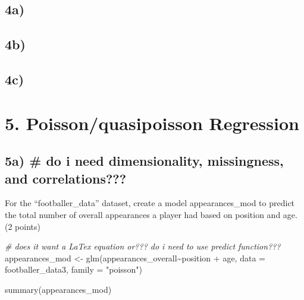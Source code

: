 \documentclass[
]{article}
\newenvironment{Shaded}{\begin{snugshade}}{\end{snugshade}}
\newcommand{\AttributeTok}[1]{\textcolor[rgb]{0.77,0.63,0.00}{#1}}
\newcommand{\CommentTok}[1]{\textcolor[rgb]{0.56,0.35,0.01}{\textit{#1}}}
\newcommand{\FunctionTok}[1]{\textcolor[rgb]{0.00,0.00,0.00}{#1}}
\newcommand{\NormalTok}[1]{#1}
\newcommand{\OtherTok}[1]{\textcolor[rgb]{0.56,0.35,0.01}{#1}}
\newcommand{\SpecialCharTok}[1]{\textcolor[rgb]{0.00,0.00,0.00}{#1}}
\newcommand{\StringTok}[1]{\textcolor[rgb]{0.31,0.60,0.02}{#1}}
\begin{document}
\hypertarget{a-2}{%
\subsection{4a)}\label{a-2}}

\hypertarget{b-2}{%
\subsection{4b)}\label{b-2}}

\hypertarget{c-3}{%
\subsection{4c)}\label{c-3}}

\hypertarget{poissonquasipoisson-regression}{%
\section{5. Poisson/quasipoisson
Regression}\label{poissonquasipoisson-regression}}

\hypertarget{a-do-i-need-dimensionality-missingness-and-correlations}{%
\subsection{5a) \# do i need dimensionality, missingness, and
correlations???}\label{a-do-i-need-dimensionality-missingness-and-correlations}}

For the ``footballer\_data'' dataset, create a model appearances\_mod to
predict the total number of overall appearances a player had based on
position and age. (2 points)

\begin{Shaded}
\begin{Highlighting}[]
\CommentTok{\# does it want a LaTex equation or??? do i need to use predict function???}
\NormalTok{appearances\_mod }\OtherTok{\textless{}{-}}
  \FunctionTok{glm}\NormalTok{(appearances\_overall}\SpecialCharTok{\textasciitilde{}}\NormalTok{position }\SpecialCharTok{+}\NormalTok{ age, }\AttributeTok{data =}\NormalTok{ footballer\_data3, }\AttributeTok{family =} \StringTok{"poisson"}\NormalTok{)}

\FunctionTok{summary}\NormalTok{(appearances\_mod)}
\end{Highlighting}
\end{Shaded}
\end{document}
